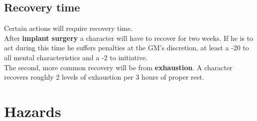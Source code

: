\documentclass[12pt,a4paper,openany]{book}
\begin{document}
	\section{Recovery time}
	Certain actions will require recovery time.\\
	After \textbf{implant surgery} a character will have to recover for two weeks. If he is to act during this time he suffers penalties at the GM’s discretion, at least a -20 to all mental characteristics and a -2 to initiative.\\
	The second, more common recovery will be from \textbf{exhaustion}. A character recovers roughly 2 levels of exhaustion per 3 hours of proper rest.
	
	\chapter{Hazards}
\end{document}
